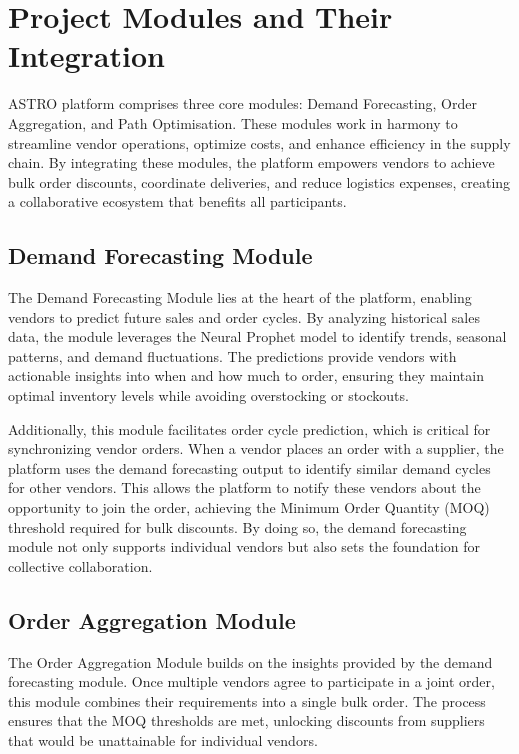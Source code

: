 \section{Project Modules and Their Integration}

ASTRO platform comprises three core modules: Demand Forecasting, Order Aggregation, and Path Optimisation. These modules work in harmony to streamline vendor operations, optimize costs, and enhance efficiency in the supply chain. By integrating these modules, the platform empowers vendors to achieve bulk order discounts, coordinate deliveries, and reduce logistics expenses, creating a collaborative ecosystem that benefits all participants.

\subsection{Demand Forecasting Module}

The Demand Forecasting Module lies at the heart of the platform, enabling vendors to predict future sales and order cycles. By analyzing historical sales data, the module leverages the Neural Prophet model to identify trends, seasonal patterns, and demand fluctuations. The predictions provide vendors with actionable insights into when and how much to order, ensuring they maintain optimal inventory levels while avoiding overstocking or stockouts.

Additionally, this module facilitates order cycle prediction, which is critical for synchronizing vendor orders. When a vendor places an order with a supplier, the platform uses the demand forecasting output to identify similar demand cycles for other vendors. This allows the platform to notify these vendors about the opportunity to join the order, achieving the Minimum Order Quantity (MOQ) threshold required for bulk discounts. By doing so, the demand forecasting module not only supports individual vendors but also sets the foundation for collective collaboration.

\subsection{Order Aggregation Module}

The Order Aggregation Module builds on the insights provided by the demand forecasting module. Once multiple vendors agree to participate in a joint order, this module combines their requirements into a single bulk order. The process ensures that the MOQ thresholds are met, unlocking discounts from suppliers that would be unattainable for individual vendors.

